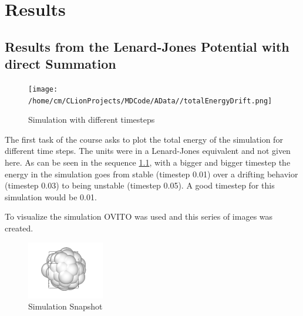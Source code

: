 \chapter{Results}

\section{Results from the Lenard-Jones Potential with direct Summation}

\begin{figure}
	\begin{center}
		\texttt{[image: /home/cm/CLionProjects/MDCode/AData//totalEnergyDrift.png]}
	\end{center}
	\caption[Simulation with different timesteps]{Simulation with different timesteps}
	\label{SimWithTimestep}
\end{figure}
The first task of the course asks to plot the total energy of the simulation for different time steps. The units were in a Lenard-Jones equivalent and not given here. As can be seen in the sequence \ref{SimWithTimestep}, with a bigger and bigger timestep the energy in the simulation goes from stable (timestep 0.01) over a drifting behavior (timestep 0.03) to being unstable (timestep 0.05). A good timestep for this simulation would be 0.01.  
\par
To visualize the simulation OVITO \cite{ovito} was used and this series of images was created.
\begin{figure}
	\begin{center}
		\includegraphics[scale= 0.65]{Figure/1ImageS.png}
	\end{center}
	\caption[Simulation Snapshot]{Simulation Snapshot}
	\label{SimulationSnapshot1}
\end{figure}

